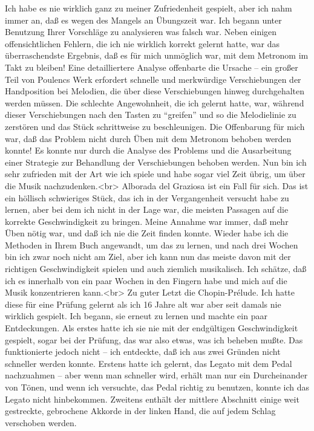 Ich habe es nie wirklich ganz zu meiner Zufriedenheit gespielt, aber ich nahm immer an, daß es wegen des Mangels an Übungszeit war.
Ich begann unter Benutzung Ihrer Vorschläge zu analysieren was falsch war.
Neben einigen offensichtlichen Fehlern, die ich nie wirklich korrekt gelernt hatte, war das überraschendste Ergebnis, daß es für mich unmöglich war, mit dem Metronom im Takt zu bleiben!
Eine detailliertere Analyse offenbarte die Ursache -- ein großer Teil von Poulencs Werk erfordert schnelle und merkwürdige Verschiebungen der Handposition bei Melodien, die über diese Verschiebungen hinweg durchgehalten werden müssen.
Die schlechte Angewohnheit, die ich gelernt hatte, war, während dieser Verschiebungen nach den Tasten zu \enquote{greifen} und so die Melodielinie zu zerstören und das Stück schrittweise zu beschleunigen.
Die Offenbarung für mich war, daß das Problem nicht durch Üben mit dem Metronom behoben werden konnte!
Es konnte nur durch die Analyse des Problems und die Ausarbeitung einer Strategie zur Behandlung der Verschiebungen behoben werden.
Nun bin ich sehr zufrieden mit der Art wie ich spiele und habe sogar viel Zeit übrig, um über die Musik nachzudenken.<br>
Alborada del Graziosa ist ein Fall für sich.
Das ist ein höllisch schwieriges Stück, das ich in der Vergangenheit versucht habe zu lernen, aber bei dem ich nicht in der Lage war, die meisten Passagen auf die korrekte Geschwindigkeit zu bringen.
Meine Annahme war immer, daß mehr Üben nötig war, und daß ich nie die Zeit finden konnte.
Wieder habe ich die Methoden in Ihrem Buch angewandt, um das zu lernen, und nach drei Wochen bin ich zwar noch nicht am Ziel, aber ich kann nun das meiste davon mit der richtigen Geschwindigkeit spielen und auch ziemlich musikalisch.
Ich schätze, daß ich es innerhalb von ein paar Wochen in den Fingern habe und mich auf die Musik konzentrieren kann.<br>
Zu guter Letzt die Chopin-Prélude.
Ich hatte diese für eine Prüfung gelernt als ich 16 Jahre alt war aber seit damals nie wirklich gespielt.
Ich begann, sie erneut zu lernen und machte ein paar Entdeckungen.
Als erstes hatte ich sie nie mit der endgültigen Geschwindigkeit gespielt, sogar bei der Prüfung, das war also etwas, was ich beheben mußte.
Das funktionierte jedoch nicht -- ich entdeckte, daß ich aus zwei Gründen nicht schneller werden konnte.
Erstens hatte ich gelernt, das Legato mit dem Pedal nachzuahmen -- aber wenn man schneller wird, erhält man nur ein Durcheinander von Tönen, und wenn ich versuchte, das Pedal richtig zu benutzen, konnte ich das Legato nicht hinbekommen.
Zweitens enthält der mittlere Abschnitt einige weit gestreckte, gebrochene Akkorde in der linken Hand, die auf jedem Schlag verschoben werden.
